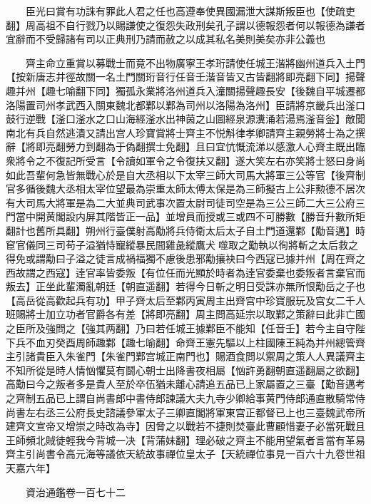 　　臣光曰賞有功誅有罪此人君之任也高遵奉使異國漏泄大謀斯叛臣也【使疏吏翻】周高祖不自行戮乃以賜謙使之復怨失政刑矣孔子謂以德報怨者何以報德為謙者宜辭而不受歸諸有司以正典刑乃請而赦之以成其私名美則美矣亦非公義也

　　齊主命立重賞以募戰士而竟不出物廣寧王孝珩請使任城王湝將幽州道兵入土門【按新唐志井徑故關一名土門關珩音行任音壬湝音皆又古皆翻將即亮翻下同】揚聲趣并州【趣七喻翻下同】獨孤永業將洛州道兵入潼關揚聲趣長安【後魏自平城遷都洛陽置司州孝武西入關東魏北都鄴以鄴為司州以洛陽為洛州】臣請將京畿兵出滏口鼓行逆戰【滏口滏水之口山海經滏水出神茵之山圖經泉源瀵涌若湯焉滏音釡】敵聞南北有兵自然逃潰又請出宫人珍寶賞將士齊主不悦斛律孝卿請齊主親勞將士為之撰辭【將即亮翻勞力到翻為于偽翻撰士免翻】且曰宜忼慨流涕以感激人心齊主既出臨衆將令之不復記所受言【令讀如軍令之令復扶又翻】遂大笑左右亦笑將士怒曰身尚如此吾輩何急皆無戰心於是自大丞相以下太宰三師大司馬大將軍三公等官【後齊制官多循後魏大丞相太宰位望最為崇重太師太傅太保是為三師擬古上公非勲德不居次有大司馬大將軍是為二大並典司武事次置太尉司徒司空是為三公三師二大三公府三門當中開黄閣設内屏其階皆正一品】並增員而授或三或四不可勝數【勝音升數所矩翻計也舊所具翻】朔州行臺僕射高勱將兵侍衛太后太子自土門道還鄴【勱音邁】時䆠官儀同三司苟子溢猶恃寵縱暴民間雞彘縱鷹犬噬取之勱執以徇將斬之太后救之得免或謂勱曰子溢之徒言成禍福獨不慮後患邪勱攘袂曰今西寇已據并州【周在齊之西故謂之西寇】逹官率皆委叛【有位任而光顯於時者為逹官委棄也委叛者言棄官而叛去】正坐此輩濁亂朝廷【朝直遥翻】若得今日斬之明日受誅亦無所恨勱岳之子也【高岳從高歡起兵有功】甲子齊太后至鄴丙寅周主出齊宫中珍寶服玩及宫女二千人班賜將士加立功者官爵各有差【將即亮翻】周主問高延宗以取鄴之策辭曰此非亡國之臣所及強問之【強其两翻】乃曰若任城王據鄴臣不能知【任音壬】若今主自守陛下兵不血刃癸酉周師趣鄴【趣七喻翻】命齊王憲先驅以上柱國陳王純為并州總管齊主引諸貴臣入朱雀門【朱雀門鄴宫城正南門也】賜酒食問以禦周之策人人異議齊主不知所從是時人情忷懼莫有鬬心朝士出降書夜相屬【忷許勇翻朝直遥翻屬之欲翻】高勱曰今之叛者多是貴人至於卒伍猶未離心請追五品已上家屬置之三臺【勱音邁考之齊制五品已上謂自尚書郎中書侍郎諫議大夫九寺少卿給事黄門侍郎通直散騎常侍尚書左右丞三公府長史諮議參軍太子三卿直閣將軍東宫正都督已上也三臺魏武帝所建齊文宣帝又增崇之時改為寺】因脅之以戰若不捷則焚臺此曹顧惜妻子必當死戰且王師頻北賊徒輕我今背城一决【背蒲妹翻】理必破之齊主不能用望氣者言當有革易齊主引尚書令高元海等議依天統故事禪位皇太子【天統禪位事見一百六十九卷世祖天嘉六年】

　　資治通鑑卷一百七十二


    


 


